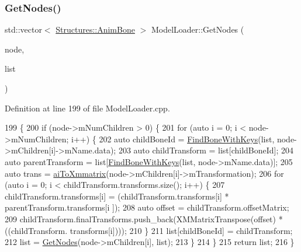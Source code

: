 \subsubsection{\texorpdfstring{Get\+Nodes()}{GetNodes()}}
{\footnotesize\ttfamily std\+::vector$<$ \mbox{\hyperlink{struct_structures_1_1_anim_bone}{Structures\+::\+Anim\+Bone}} $>$ Model\+Loader\+::\+Get\+Nodes (\begin{DoxyParamCaption}\item[{ai\+Node $\ast$}]{node,  }\item[{std\+::vector$<$ \mbox{\hyperlink{struct_structures_1_1_anim_bone}{Structures\+::\+Anim\+Bone}} $>$}]{list }\end{DoxyParamCaption})\hspace{0.3cm}{\ttfamily [private]}}



Definition at line 199 of file Model\+Loader.\+cpp.


\begin{DoxyCode}
199                                                                                                       \{
200     \textcolor{keywordflow}{if} (node->mNumChildren > 0) \{
201         \textcolor{keywordflow}{for} (\textcolor{keyword}{auto} i = 0; i < node->mNumChildren; i++) \{
202             \textcolor{keyword}{auto} childBoneId = \mbox{\hyperlink{class_model_loader_a5356ad9c0e77c4b5142c1c1400b01048}{FindBoneWithKeys}}(list, node->mChildren[i]->mName.data);
203             \textcolor{keyword}{auto} childTransform = list[childBoneId];
204             \textcolor{keyword}{auto} parentTransform = list[\mbox{\hyperlink{class_model_loader_a5356ad9c0e77c4b5142c1c1400b01048}{FindBoneWithKeys}}(list, node->mName.data)];
205             \textcolor{keyword}{auto} trans = \mbox{\hyperlink{class_model_loader_ab142e176c572ea327518f01fb2f0630b}{aiToXmmatrix}}(node->mChildren[i]->mTransformation);
206             \textcolor{keywordflow}{for} (\textcolor{keyword}{auto} i = 0; i < childTransform.transforms.size(); i++) \{
207                 childTransform.transforms[i] = (childTransform.transforms[i] * parentTransform.transforms[i
      ]);
208                 \textcolor{keyword}{auto} offset = childTransform.offsetMatrix;
209                 childTransform.finalTransforms.push\_back(XMMatrixTranspose(offset) * ((childTransform.
      transforms[i])));
210             \}
211             list[childBoneId] = childTransform;
212             list = \mbox{\hyperlink{class_model_loader_afabe255fd413f08ac9939e786f26aee4}{GetNodes}}(node->mChildren[i], list);
213         \}
214     \}
215     \textcolor{keywordflow}{return} list;
216 \}
\end{DoxyCode}
\mbox{\label{class_model_loader_aca3f1bef5b2ab890212784626559482c}} 
